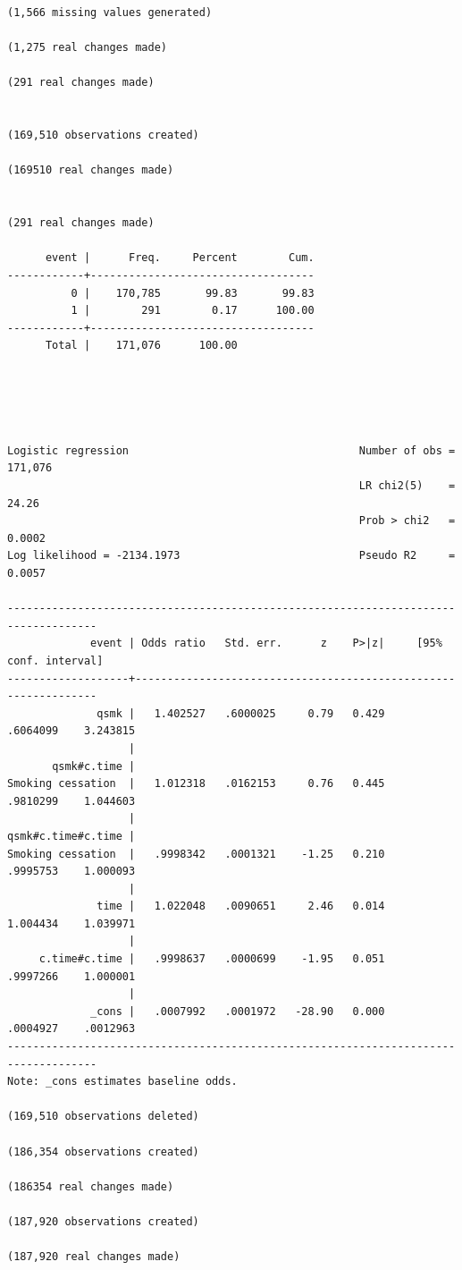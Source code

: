 \documentclass[
  10pt,
  a4paper,
]{book}
\begin{document}
\begin{verbatim}
(1,566 missing values generated)

(1,275 real changes made)

(291 real changes made)


(169,510 observations created)

(169510 real changes made)


(291 real changes made)

      event |      Freq.     Percent        Cum.
------------+-----------------------------------
          0 |    170,785       99.83       99.83
          1 |        291        0.17      100.00
------------+-----------------------------------
      Total |    171,076      100.00





Logistic regression                                    Number of obs = 171,076
                                                       LR chi2(5)    =   24.26
                                                       Prob > chi2   =  0.0002
Log likelihood = -2134.1973                            Pseudo R2     =  0.0057

------------------------------------------------------------------------------------
             event | Odds ratio   Std. err.      z    P>|z|     [95% conf. interval]
-------------------+----------------------------------------------------------------
              qsmk |   1.402527   .6000025     0.79   0.429     .6064099    3.243815
                   |
       qsmk#c.time |
Smoking cessation  |   1.012318   .0162153     0.76   0.445     .9810299    1.044603
                   |
qsmk#c.time#c.time |
Smoking cessation  |   .9998342   .0001321    -1.25   0.210     .9995753    1.000093
                   |
              time |   1.022048   .0090651     2.46   0.014     1.004434    1.039971
                   |
     c.time#c.time |   .9998637   .0000699    -1.95   0.051     .9997266    1.000001
                   |
             _cons |   .0007992   .0001972   -28.90   0.000     .0004927    .0012963
------------------------------------------------------------------------------------
Note: _cons estimates baseline odds.

(169,510 observations deleted)

(186,354 observations created)

(186354 real changes made)

(187,920 observations created)

(187,920 real changes made)







\end{verbatim}
\end{document}
